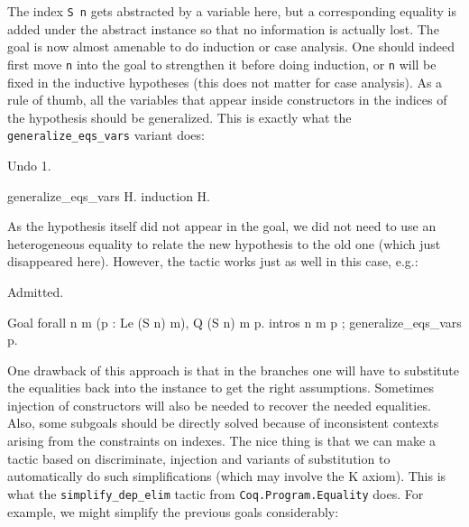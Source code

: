 The index {\tt S n} gets abstracted by a variable here, but a
corresponding equality is added under the abstract instance so that no
information is actually lost. The goal is now almost amenable to do induction
or case analysis. One should indeed first move {\tt n} into the goal to
strengthen it before doing induction, or {\tt n} will be fixed in
the inductive hypotheses (this does not matter for case analysis). 
As a rule of thumb, all the variables that appear inside constructors in
the indices of the hypothesis should be generalized. This is exactly
what the \texttt{generalize\_eqs\_vars} variant does:

\begin{coq_eval} 
Undo 1.
\end{coq_eval}
\begin{coq_example}
generalize_eqs_vars H.
induction H.
\end{coq_example}

As the hypothesis itself did not appear in the goal, we did not need to
use an heterogeneous equality to relate the new hypothesis to the old
one (which just disappeared here). However, the tactic works just as well
in this case, e.g.:

\begin{coq_eval}
Admitted.
\end{coq_eval}

\begin{coq_example}
Goal forall n m (p : Le (S n) m), Q (S n) m p.
intros n m p ; generalize_eqs_vars p.
\end{coq_example}

One drawback of this approach is that in the branches one will have to
substitute the equalities back into the instance to get the right
assumptions. Sometimes injection of constructors will also be needed to
recover the needed equalities. Also, some subgoals should be directly
solved because of inconsistent contexts arising from the constraints on 
indexes. The nice thing is that we can make a tactic based on
discriminate, injection and variants of substitution to automatically 
do such simplifications (which may involve the K axiom). 
This is what the {\tt simplify\_dep\_elim} tactic from
{\tt Coq.Program.Equality} does. For example, we might simplify the
previous goals considerably:

